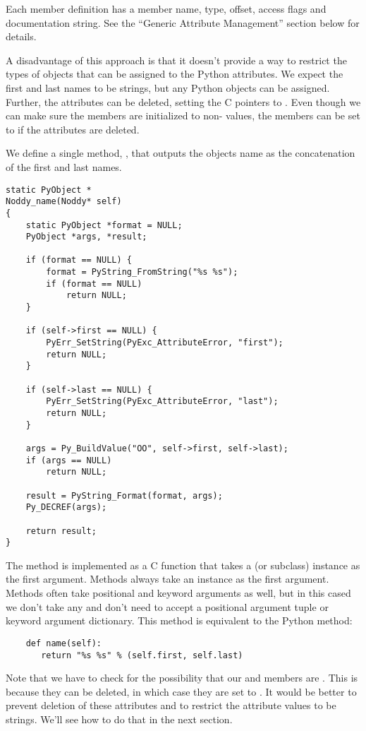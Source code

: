 Each member definition has a member name, type, offset, access flags
and documentation string. See the ``Generic Attribute Management''
section below for details.

A disadvantage of this approach is that it doesn't provide a way to
restrict the types of objects that can be assigned to the Python
attributes.  We expect the first and last names to be strings, but any
Python objects can be assigned.  Further, the attributes can be
deleted, setting the C pointers to \NULL.  Even though we can make
sure the members are initialized to non-\NULL{} values, the members can
be set to \NULL{} if the attributes are deleted.

We define a single method, , that outputs the objects
name as the concatenation of the first and last names.

\begin{verbatim}
static PyObject *
Noddy_name(Noddy* self)
{
    static PyObject *format = NULL;
    PyObject *args, *result;

    if (format == NULL) {
        format = PyString_FromString("%s %s");
        if (format == NULL)
            return NULL;
    }

    if (self->first == NULL) {
        PyErr_SetString(PyExc_AttributeError, "first");
        return NULL;
    }

    if (self->last == NULL) {
        PyErr_SetString(PyExc_AttributeError, "last");
        return NULL;
    }

    args = Py_BuildValue("OO", self->first, self->last);
    if (args == NULL)
        return NULL;

    result = PyString_Format(format, args);
    Py_DECREF(args);

    return result;
}
\end{verbatim}

The method is implemented as a C function that takes a  (or
 subclass) instance as the first argument.  Methods
always take an instance as the first argument. Methods often take
positional and keyword arguments as well, but in this cased we don't
take any and don't need to accept a positional argument tuple or
keyword argument dictionary. This method is equivalent to the Python
method:

\begin{verbatim}
    def name(self):
       return "%s %s" % (self.first, self.last)
\end{verbatim}

Note that we have to check for the possibility that our 
and  members are \NULL.  This is because they can be
deleted, in which case they are set to \NULL.  It would be better to
prevent deletion of these attributes and to restrict the attribute
values to be strings.  We'll see how to do that in the next section.

